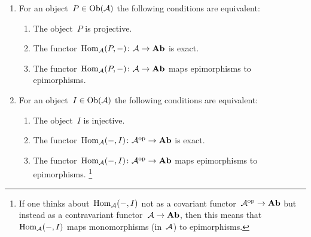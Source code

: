 \begin{lemma}
  \leavevmode
  \begin{enumerate}
    \item
      \label{characterization of projectives}
      For an object~$P \in \operatorname{Ob}(\mathcal{A})$ the following conditions are equivalent:
      \begin{enumerate}
        \item
          \label{is projective}
          The object~$P$ is projective.
        \item
          \label{is exact}
          The functor~$\operatorname{Hom}_{\mathcal{A}}(P,-) \colon \mathcal{A} \to \mathbf{Ab}$ is exact.
        \item
          \label{sends epis to epis}
          The functor~$\operatorname{Hom}_{\mathcal{A}}(P,-) \colon \mathcal{A} \to \mathbf{Ab}$ maps epimorphisms to epimorphisms.
      \end{enumerate}
    \item
      For an object~$I \in \operatorname{Ob}(\mathcal{A})$ the following conditions are equivalent:
      \begin{enumerate}
        \label{characterization of injectives}
        \item
          The object~$I$ is injective.
        \item
          The functor~$\operatorname{Hom}_{\mathcal{A}}(-,I) \colon \mathcal{A}^{\mathrm{op}} \to \mathbf{Ab}$ is exact.
        \item
          The functor~$\operatorname{Hom}_{\mathcal{A}}(-,I) \colon \mathcal{A}^{\mathrm{op}} \to \mathbf{Ab}$ maps epimorphisms to epimorphisms.%
          \footnote{If one thinks about~$\operatorname{Hom}_{\mathcal{A}}(-,I)$ not as a covariant functor~$\mathcal{A}^{\mathrm{op}} \to \mathbf{Ab}$ but instead as a contravariant functor~$\mathcal{A} \to \mathbf{Ab}$, then this means that~$\operatorname{Hom}_{\mathcal{A}}(-,I)$ maps monomorphisms (in~$\mathcal{A}$) to epimorphisms.}
      \end{enumerate}
  \end{enumerate}
\end{lemma}


